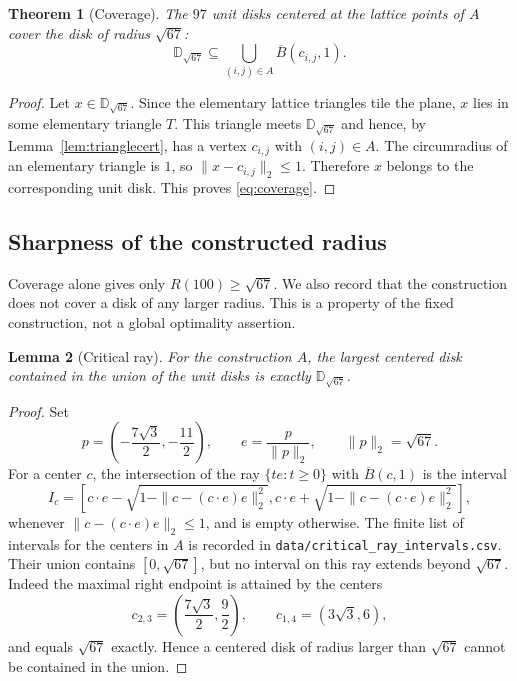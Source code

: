 \documentclass[11pt]{article}
\newtheorem{theorem}{Theorem}[section]
\newtheorem{lemma}[theorem]{Lemma}
\theoremstyle{definition}
\newcommand{\D}{\mathbb{D}}
\begin{document}
\begin{theorem}[Coverage]
\label{thm:coverage}
The $97$ unit disks centered at the lattice points of $A$ cover the
disk of radius $\sqrt{67}$:
\begin{equation}
  \D_{\sqrt{67}}
  \subseteq
  \bigcup_{(i,j)\in A}\overline B(c_{i,j},1).
  \label{eq:coverage}
\end{equation}
\end{theorem}

\begin{proof}
Let $x\in\D_{\sqrt{67}}$.  Since the elementary lattice triangles tile
the plane, $x$ lies in some elementary triangle $T$.  This triangle
meets $\D_{\sqrt{67}}$ and hence, by Lemma~\ref{lem:trianglecert}, has
a vertex $c_{i,j}$ with $(i,j)\in A$.  The circumradius of an
elementary triangle is $1$, so $\|x-c_{i,j}\|_2\le1$.  Therefore
$x$ belongs to the corresponding unit disk.  This proves
\eqref{eq:coverage}.
\end{proof}

\subsection{Sharpness of the constructed radius}

Coverage alone gives only $R(100)\ge\sqrt{67}$.  We also record that the
construction does not cover a disk of any larger radius.  This is a
property of the fixed construction, not a global optimality assertion.

\begin{lemma}[Critical ray]
\label{lem:sharp}
For the construction $A$, the largest centered disk contained in the
union of the unit disks is exactly $\D_{\sqrt{67}}$.
\end{lemma}

\begin{proof}
Set
\begin{equation}
  p=\left(-\frac{7\sqrt3}{2},-\frac{11}{2}\right),
  \qquad
  e=\frac{p}{\|p\|_2},
  \qquad
  \|p\|_2=\sqrt{67}.
  \label{eq:criticalpoint}
\end{equation}
For a center $c$, the intersection of the ray $\{te:t\ge0\}$ with
$\overline B(c,1)$ is the interval
\begin{equation}
  I_c=
  \left[
  c\cdot e-\sqrt{1-\|c-(c\cdot e)e\|_2^2},
  c\cdot e+\sqrt{1-\|c-(c\cdot e)e\|_2^2}
  \right],
  \label{eq:rayinterval}
\end{equation}
whenever $\|c-(c\cdot e)e\|_2\le1$, and is empty otherwise.
The finite list of intervals for the centers in $A$ is recorded in
\texttt{data/critical\_ray\_intervals.csv}.  Their union contains
$[0,\sqrt{67}]$, but no interval on this ray extends beyond
$\sqrt{67}$.  Indeed the maximal right endpoint is attained by the
centers
\begin{equation}
  c_{2,3}=\left(\frac{7\sqrt3}{2},\frac92\right),
  \qquad
  c_{1,4}=(3\sqrt3,6),
  \label{eq:criticalcenters}
\end{equation}
and equals $\sqrt{67}$ exactly.  Hence a centered disk of radius larger
than $\sqrt{67}$ cannot be contained in the union.
\end{proof}
\end{document}

